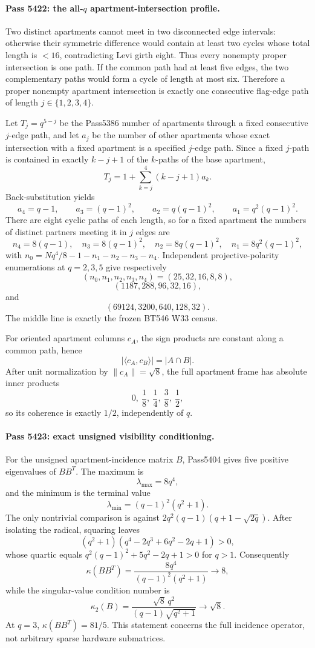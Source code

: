 \paragraph{Pass 5422: the all-$q$ apartment-intersection profile.}
Two distinct apartments cannot meet in two disconnected edge intervals: otherwise their symmetric difference would contain at least two cycles whose total length is $<16$, contradicting Levi girth eight.  Thus every nonempty proper intersection is one path.  If the common path had at least five edges, the two complementary paths would form a cycle of length at most six.  Therefore a proper nonempty apartment intersection is exactly one consecutive flag-edge path of length $j\in\{1,2,3,4\}$.

Let $T_j=q^{5-j}$ be the Pass5386 number of apartments through a fixed consecutive $j$-edge path, and let $a_j$ be the number of other apartments whose exact intersection with a fixed apartment is a specified $j$-edge path.  Since a fixed $j$-path is contained in exactly $k-j+1$ of the $k$-paths of the base apartment,
\[
 T_j=1+\sum_{k=j}^4(k-j+1)a_k.
\]
Back-substitution yields
\[
 a_4=q-1,\qquad
 a_3=(q-1)^2,\qquad
 a_2=q(q-1)^2,\qquad
 a_1=q^2(q-1)^2.
\]
There are eight cyclic paths of each length, so for a fixed apartment the numbers of distinct partners meeting it in $j$ edges are
\[
 \boxed{n_4=8(q-1),\quad n_3=8(q-1)^2,\quad n_2=8q(q-1)^2,\quad n_1=8q^2(q-1)^2},
\]
with $n_0=Nq^4/8-1-n_1-n_2-n_3-n_4$.  Independent projective-polarity enumerations at $q=2,3,5$ give respectively
\[
 (n_0,n_1,n_2,n_3,n_4)=(25,32,16,8,8),
\]
\[
 (1187,288,96,32,16),
\]
and
\[
 (69124,3200,640,128,32).
\]
The middle line is exactly the frozen BT546 W33 census.

For oriented apartment columns $c_A$, the sign products are constant along a common path, hence
\[
 |\langle c_A,c_B\rangle|=|A\cap B|.
\]
After unit normalization by $\|c_A\|=\sqrt8$, the full apartment frame has absolute inner products
\[
 0,\ \frac18,\ \frac14,\ \frac38,\ \frac12,
\]
so its coherence is exactly $1/2$, independently of $q$.

\paragraph{Pass 5423: exact unsigned visibility conditioning.}
For the unsigned apartment-incidence matrix $B$, Pass5404 gives five positive eigenvalues of $BB^T$.  The maximum is
\[
 \lambda_{\max}=8q^4,
\]
and the minimum is the terminal value
\[
 \boxed{\lambda_{\min}=(q-1)^2(q^2+1)}.
\]
The only nontrivial comparison is against
$2q^2(q-1)(q+1-\sqrt{2q})$.  After isolating the radical, squaring leaves
\[
 (q^2+1)(q^4-2q^3+6q^2-2q+1)>0,
\]
whose quartic equals $q^2(q-1)^2+5q^2-2q+1>0$ for $q>1$.  Consequently
\[
 \boxed{\kappa(BB^T)=\frac{8q^4}{(q-1)^2(q^2+1)}\longrightarrow8},
\]
while the singular-value condition number is
\[
 \boxed{\kappa_2(B)=\frac{\sqrt8\,q^2}{(q-1)\sqrt{q^2+1}}\longrightarrow\sqrt8}.
\]
At $q=3$, $\kappa(BB^T)=81/5$.  This statement concerns the full incidence operator, not arbitrary sparse hardware submatrices.

